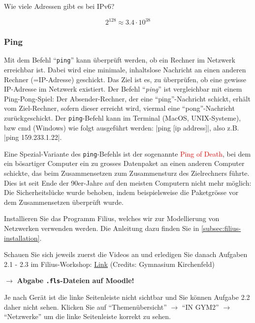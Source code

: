 \begin{myexercise}
	Wie viele Adressen gibt es bei IPv6?
	\begin{myanswer}
		\[2^{128} \approx 3.4\cdot 10^{38}\]
	\end{myanswer}
\end{myexercise}


\subsubsection{Ping}
Mit dem Befehl ``\texttt{ping}'' kann überprüft werden, ob ein Rechner im Netzwerk erreichbar ist. Dabei wird eine minimale, inhaltslose Nachricht an einen anderen Rechner (=IP-Adresse) geschickt. Das Ziel ist es, zu überprüfen, ob eine gewisse IP-Adresse im Netzwerk existiert. Der Befehl ``\textit{ping}'' ist vergleichbar mit einem Ping-Pong-Spiel: Der Absender-Rechner, der eine ``ping''-Nachricht schickt, erhält vom Ziel-Rechner, sofern dieser erreicht wird, viermal eine ``pong''-Nachricht zurückgeschickt. Der \texttt{ping}-Befehl kann im Terminal (MacOS, UNIX-Systeme), bzw cmd (Windows) wie folgt ausgeführt werden: \commandbox|ping [ip address]|, also z.B. \commandbox|ping 159.233.1.22|.

\begin{mycaution}
	Eine Spezial-Variante des \texttt{ping}-Befehls ist der sogenannte \textcolor{red}{\faSkull{} Ping of Death}, bei dem ein bösartiger Computer ein zu grosses Datenpaket an einen anderen Computer schickte, das beim Zusammensetzen zum Zusammensturz des Zielrechners führte. Dies ist seit Ende der 90er-Jahre auf den meisten Computern nicht mehr möglich: Die Sicherheitslücke wurde behoben, indem beispielsweise die Paketgrösse vor dem Zusammensetzen überprüft wurde.
\end{mycaution}

\begin{myexercise}
	Installieren Sie das Programm Filius, welches wir zur Modellierung von Netzwerken verwenden werden. Die Anleitung dazu finden Sie in \cref{subsec:filius-installation}.
\end{myexercise}

\begin{mysubmission}
	Schauen Sie sich jeweils zuerst die Videos an und erledigen Sie danach Aufgaben 2.1 - 2.3 im Filius-Workshop: \href{https://informatik.mygymer.ch/base/?book=network}{Link} (Credits: Gymnasium Kirchenfeld)

	$\rightarrow$ \textbf{Abgabe \texttt{.fls}-Dateien auf Moodle!}
	\begin{mycaution}
		Je nach Gerät ist die linke Seitenleiste nicht sichtbar und Sie können Aufgabe 2.2 daher nicht sehen. Klicken Sie auf ``Themenübersicht'' $\rightarrow$  ``IN GYM2'' $\rightarrow$ ``Netzwerke'' um die linke Seitenleiste korrekt zu sehen.
	\end{mycaution}
\end{mysubmission}

